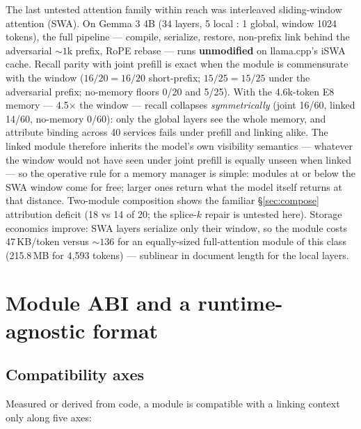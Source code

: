 \documentclass[11pt]{article}
\begin{document}
The last untested attention family within reach was interleaved sliding-window attention (SWA). On Gemma 3 4B (34 layers, 5 local : 1 global, window 1024 tokens), the full pipeline --- compile, serialize, restore, non-prefix link behind the adversarial ${\sim}1$k prefix, RoPE rebase --- runs \textbf{unmodified} on llama.cpp's iSWA cache. Recall parity with joint prefill is exact when the module is commensurate with the window ($16/20 = 16/20$ short-prefix; $15/25 = 15/25$ under the adversarial prefix; no-memory floors 0/20 and 5/25). With the 4.6k-token E8 memory --- 4.5$\times$ the window --- recall collapses \emph{symmetrically} (joint 16/60, linked 14/60, no-memory 0/60): only the global layers see the whole memory, and attribute binding across 40 services fails under prefill and linking alike. The linked module therefore inherits the model's own visibility semantics --- whatever the window would not have seen under joint prefill is equally unseen when linked --- so the operative rule for a memory manager is simple: modules at or below the SWA window come for free; larger ones return what the model itself returns at that distance. Two-module composition shows the familiar \S\ref{sec:compose} attribution deficit (18 vs 14 of 20; the splice-$k$ repair is untested here). Storage economics improve: SWA layers serialize only their window, so the module costs 47\,KB/token versus ${\sim}136$ for an equally-sized full-attention module of this class (215.8\,MB for 4{,}593 tokens) --- sublinear in document length for the local layers.

\section{Module ABI and a runtime-agnostic format}
\label{sec:abi}

\subsection{Compatibility axes}
\label{sec:axes}

Measured or derived from code, a module is compatible with a linking context only along five axes:
\end{document}
